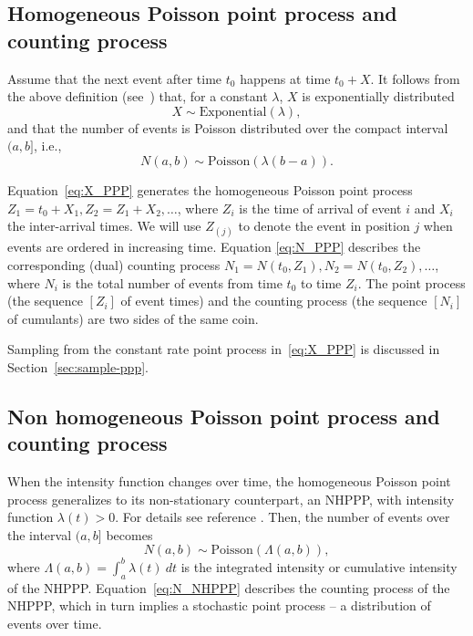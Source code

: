 \documentclass[10pt,letterpaper]{article}
\begin{document}
\subsection{Homogeneous Poisson point process and counting process}\label{sec:ppp-intro}
Assume that the next event after time $t_0$ happens at time $t_0 + X$. It follows from the above definition (see~\cite[par. 4.1]{cox1965theory}) that, for a constant $\lambda$, $X$ is exponentially distributed
\begin{equation}\label{eq:X_PPP}
X \sim \text{Exponential}(\lambda),
\end{equation}
and that the number of events is Poisson distributed over the compact interval $(a, b]$, i.e.,
\begin{equation}\label{eq:N_PPP}
N(a, b) \sim \text{Poisson}(\lambda (b-a)).
\end{equation}

Equation~\eqref{eq:X_PPP} generates the homogeneous Poisson point process ${Z_1 = t_0 + X_1, Z_2 = Z_1 + X_2, \dots}$, where $Z_i$ is the time of arrival of event $i$ and $X_i$ the inter-arrival times. We will use $Z_{(j)}$ to denote the event in position $j$ when events are ordered in increasing time.
%
Equation \eqref{eq:N_PPP} describes the corresponding (dual) counting process
${N_1 = N(t_0, Z_1)}, {N_2 = N(t_0, Z_2), \dots}$, where $N_i$ is the total number of events from time $t_0$ to time $Z_i$. The point process (the sequence $[Z_i]$ of event times) and the counting process (the sequence $[N_i]$ of cumulants) are two sides of the same coin.

Sampling from the constant rate point process in~\eqref{eq:X_PPP} is discussed in Section~\ref{sec:sample-ppp}.



\subsection{Non homogeneous Poisson point process and counting process}\label{sec:nhppp-intro}
When the intensity function changes over time, the homogeneous Poisson point process generalizes to its non-stationary counterpart, an NHPPP, with intensity function $\lambda(t) > 0$. For details see reference \cite[par 4.2]{cox1965theory}. Then, the number of events over the interval $(a, b]$ becomes
\begin{equation}\label{eq:N_NHPPP}
N(a, b) \sim \text{Poisson}(\Lambda(a, b)),
\end{equation}
where $\Lambda(a, b) = \int_a^b \lambda(t) \ dt$ is the integrated intensity or cumulative intensity of the NHPPP. Equation~\eqref{eq:N_NHPPP} describes the counting process of the NHPPP, which in turn implies a stochastic point process -- a distribution of events over time.
\end{document}
